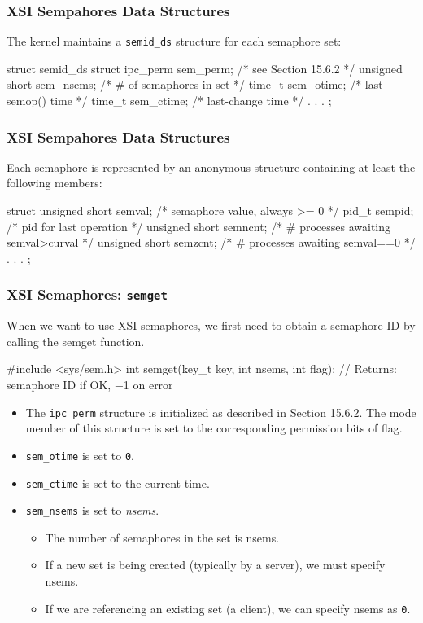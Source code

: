 \documentclass[newPxFont,sthlmFooter,nooffset]{beamer}
\begin{document}
\begin{frame}[t, fragile]
  \frametitle{XSI Sempahores Data Structures}
The kernel maintains a \texttt{semid\_ds} structure for each semaphore set:
\begin{codedefnb}
struct semid_ds {
     struct ipc_perm  sem_perm;  /* see Section 15.6.2 */
     unsigned short   sem_nsems; /* # of semaphores in set */ 
     time_t           sem_otime; /* last-semop() time */
     time_t           sem_ctime; /* last-change time */
     .
     .
     .
};  
\end{codedefnb}
\end{frame}



\begin{frame}[t, fragile]
  \frametitle{XSI Sempahores Data Structures}
Each semaphore is represented by an anonymous structure containing at least the following members:
\begin{codedefnb}
struct {
     unsigned short  semval;   /* semaphore value, always >= 0 */
     pid_t           sempid;   /* pid for last operation */
     unsigned short  semncnt;  /* # processes awaiting semval>curval */
     unsigned short  semzcnt;  /* # processes awaiting semval==0 */
     .
     .
     .
};
\end{codedefnb}
\end{frame}



\begin{frame}[t, fragile]
  \frametitle{XSI Semaphores: \texttt{semget}}
When we want to use XSI semaphores, we first need to obtain a semaphore ID by
calling the semget function.

\begin{codedef}
#include <sys/sem.h>
int semget(key_t key, int nsems, int flag);
// Returns: semaphore ID if OK, −1 on error
\end{codedef}
\begin{itemize}
\item The \texttt{ipc\_perm} structure is initialized as described in Section 15.6.2. The mode member of this structure is set to the corresponding permission bits of flag.
\item \texttt{sem\_otime} is set to \texttt{0}.
\item \texttt{sem\_ctime} is set to the current time.
\item \texttt{sem\_nsems} is set to \textit{nsems}.
  \begin{itemize}
  \item The number of semaphores in the set is nsems.
  \item If a new set is being created (typically by a server), we must specify nsems.
  \item If we are referencing an existing set (a client), we can specify nsems as \texttt{0}.
  \end{itemize}

\end{itemize}
\end{frame}
\end{document}
